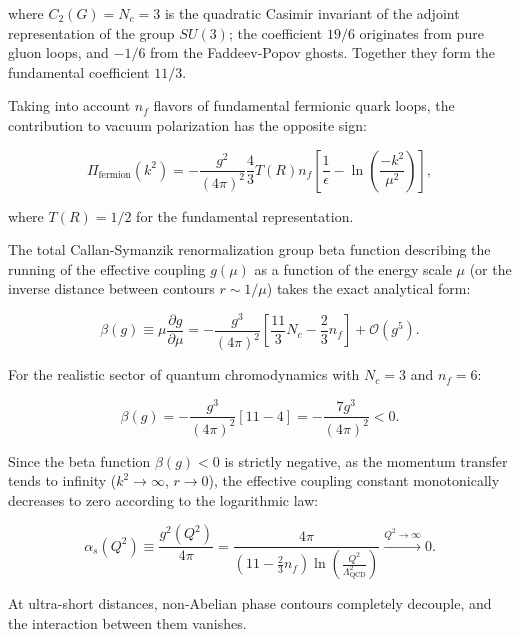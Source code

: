 where $C_2(G) = N_c = 3$ is the quadratic Casimir invariant of the adjoint representation of the group $SU(3)$; the coefficient $19/6$ originates from pure gluon loops, and $-1/6$ from the Faddeev-Popov ghosts. Together they form the fundamental coefficient $11/3$.

Taking into account $n_f$ flavors of fundamental fermionic quark loops, the contribution to vacuum polarization has the opposite sign:

\begin{equation}\label{eq:2.3.24}\tag{2.3.24}
\Pi_{\text{fermion}}(k^2) = - \frac{g^2}{(4\pi)^2} \frac{4}{3} T(R) n_f \left[ \frac{1}{\epsilon} - \ln\left( \frac{-k^2}{\mu^2} \right) \right],
\end{equation}

where $T(R) = 1/2$ for the fundamental representation.

The total Callan-Symanzik renormalization group beta function describing the running of the effective coupling $g(\mu)$ as a function of the energy scale $\mu$ (or the inverse distance between contours $r \sim 1/\mu$) takes the exact analytical form:

\begin{equation}\label{eq:2.3.25}\tag{2.3.25}
\beta(g) \equiv \mu \frac{\partial g}{\partial \mu} = - \frac{g^3}{(4\pi)^2} \left[ \frac{11}{3} N_c - \frac{2}{3} n_f \right] + \mathcal{O}(g^5).
\end{equation}

For the realistic sector of quantum chromodynamics with $N_c = 3$ and $n_f = 6$:

\begin{equation}\label{eq:2.3.26}\tag{2.3.26}
\beta(g) = - \frac{g^3}{(4\pi)^2} \left[ 11 - 4 \right] = - \frac{7 g^3}{(4\pi)^2} < 0.
\end{equation}

\begin{theorem}\label{thm:2.3.2}
Since the beta function $\beta(g) < 0$ is strictly negative, as the momentum transfer tends to infinity ($k^2 \to \infty$, $r \to 0$), the effective coupling constant monotonically decreases to zero according to the logarithmic law:

\begin{equation}\label{eq:2.3.27}\tag{2.3.27}
\alpha_s(Q^2) \equiv \frac{g^2(Q^2)}{4\pi} = \frac{4\pi}{\left( 11 - \frac{2}{3}n_f \right) \ln\left( \frac{Q^2}{\Lambda_{\text{QCD}}^2} \right)} \xrightarrow{Q^2 \to \infty} 0.
\end{equation}

At ultra-short distances, non-Abelian phase contours completely decouple, and the interaction between them vanishes.
\end{theorem}

